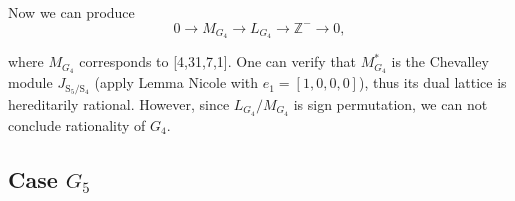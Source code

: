 \documentclass{article}
\theoremstyle{plain}
\theoremstyle{definition}
\newcommand{\Z}{\ensuremath{\mathbb{Z}}}
\newcommand{\tand}{\ensuremath{\,\,\, \text{and} \,\,\,}}
\newcommand{\exactseqs}[1]{\ensuremath{0 \longrightarrow M_{#1} \longrightarrow L_{#1} \longrightarrow \Z^{-} \longrightarrow 0}}
\begin{document}
Now we can produce
$$
\exactseqs{G_4}
,$$

where $M_{G_4}$ corresponds to [4,31,7,1]. One can verify that $M_{G_4}^*$ is the Chevalley module $J_{\mathrm{S}_5/\mathrm{S}_4}$ (apply Lemma Nicole with $e_1 =[1,0,0,0]$), thus its dual lattice is hereditarily rational. However, since $L_{G_4}/M_{G_4}$ is sign permutation, we can not conclude rationality of $G_4$.

\subsection{Case $G_5$}
\end{document}
